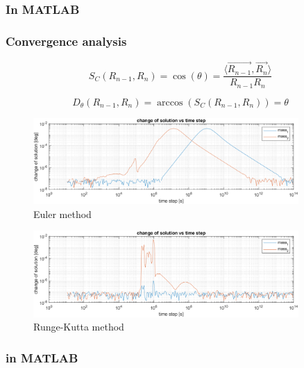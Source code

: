 \documentclass[english,12pt,a4paper]{beamer}
\begin{document}
	\begin{frame}
		\frametitle{In MATLAB}
		
	\end{frame}
	
	\begin{frame}
		\frametitle{Convergence analysis}
		\begin{equation}
			S_C(R_{n-1}, R_{n}) = \cos(\theta) = \dfrac{\langle \vec{R_{n-1}}, \vec{R_{n}} \rangle}{R_{n-1} R_{n}}
		\end{equation}
		
		\begin{equation}
			D_\theta (R_{n-1}, R_{n}) = \arccos(S_C(R_{n-1}, R_{n})) = \theta
		\end{equation}
	\end{frame}
	
	\begin{frame}
		\begin{figure}[h!]
			\centering
			\includegraphics[width = 0.9\textwidth]{euler_err.png}
			\caption{\scriptsize Euler method}
		\end{figure}
		
		\begin{figure}[h!]
			\centering
			\includegraphics[width = 0.9\textwidth]{RK4_err.png}
			\caption{\scriptsize Runge-Kutta method}
		\end{figure}
		
	\end{frame}
	
	\begin{frame}
		\frametitle{in MATLAB}
		
	\end{frame}
	
\end{document}
